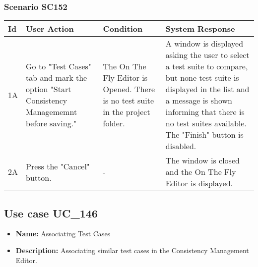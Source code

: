 \documentclass[a4paper,11pt]{article}
\newcommand{\bl}{\\ \hline}
\begin{document}
\subsubsection*{Scenario SC152}
\begin{tabular}{|p{0.4in}|p{1.5in}|p{1.5in}|p{1.5in}|}
\hline
Id & User Action & Condition & System Response \bl 
1A & Go to "Test Cases" tab and mark the option "Start
						Consistency Managememnt before saving." & The On The Fly Editor is Opened. There is no test suite
						in the project folder. & A window is displayed asking the user to select a test
						suite to compare, but none test suite is displayed in the list and
						a message is shown informing that there is no test suites
						available. The "Finish" button is disabled. \bl
2A & Press the "Cancel" button. & - & The window is closed and the On The Fly Editor is
						displayed.\bl
\end{tabular}
\subsection*{Use case UC_146}
\begin{itemize}
\item {\bf Name: }Associating Test Cases
\item {\bf Description: }Associating similar test cases in the Consistency
				Management Editor.
\end{itemize}
\end{document}
